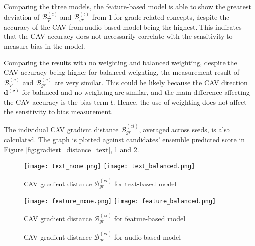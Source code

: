 Comparing the three models, the feature-based model is able to show the greatest deviation of $\mathcal{B}^{(c)}_{\nabla}$ and $\mathcal{B}^{(c)}_{gr}$ from 1 for grade-related concepts, despite the accuracy of the CAV from audio-based model being the highest. This indicates that the CAV accuracy does not necessarily correlate with the sensitivity to measure bias in the model.

Comparing the results with no weighting and balanced weighting, despite the CAV accuracy being higher for balanced weighting, the measurement result of $\mathcal{B}^{(c)}_{\nabla}$ and $\mathcal{B}^{(c)}_{gr}$ are very similar. This could be likely because the CAV direction $\boldsymbol{d^{(c)}}$ for balanced and no weighting are similar, and the main difference affecting the CAV accuracy is the bias term $b$. Hence, the use of weighting does not affect the sensitivity to bias measurement.

The individual CAV gradient distance $\mathcal{B}^{(ci)}_{gr}$, averaged across seeds, is also calculated. The graph is plotted against candidates’ ensemble predicted score in Figure \ref{fig:gradient_distance_text}, \ref{fig:gradient_distance_feature} and \ref{fig:gradient_distance_audio}.

\begin{figure}[H]
    \centering
    \begin{minipage}[t]{0.48\textwidth}
        \centering
        \texttt{[image: text\_none.png]}
        \hfill
        \texttt{[image: text\_balanced.png]}
        \caption{CAV gradient distance $\mathcal{B}^{(ci)}_{gr}$ for text-based model}
        \label{fig:gradient_distance_text}
    \end{minipage}
    \hfill
    \begin{minipage}[t]{0.48\textwidth}
        \centering
        \texttt{[image: feature\_none.png]}
        \hfill
        \texttt{[image: feature\_balanced.png]}
        \caption{CAV gradient distance $\mathcal{B}^{(ci)}_{gr}$ for feature-based model}
        \label{fig:gradient_distance_feature}
    \end{minipage}
\end{figure}

\begin{figure}[H]
    \centering
    \caption{CAV gradient distance $\mathcal{B}^{(ci)}_{gr}$ for audio-based model}
    \label{fig:gradient_distance_audio}
\end{figure}


